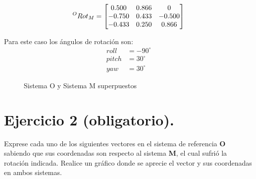 \documentclass[a4paper,12pt]{article}
\begin{document}
\begin{equation*}
    \prescript{O}{}{Rot_M} = 
    \begin{bmatrix}
        0.500  &  0.866   & 0      \\
        -0.750 &  0.433   & -0.500 \\
        -0.433 &  0.250   & 0.866
    \end{bmatrix}
\end{equation*}

Para este caso los ángulos de rotación son:
\begin{align*}
    roll  &= -90^\circ\\
    pitch &=  30^\circ\\
    yaw   &=  30^\circ
\end{align*}
    
\begin{figure}[H]
    \centering
    \begin{adjustbox}{scale = 0.85, max width=\columnwidth}
    \end{adjustbox}
    \caption{Sistema O y Sistema M superpuestos}
\end{figure}


\section{Ejercicio 2 (obligatorio).}

Exprese cada uno de los siguientes vectores en el sistema de referencia \textbf{O} sabiendo que sus coordenadas son respecto al sistema \textbf{M},
el cual sufrió la rotación indicada. Realice un gráfico donde se aprecie el vector y sus coordenadas en ambos 
sistemas.
\end{document}
